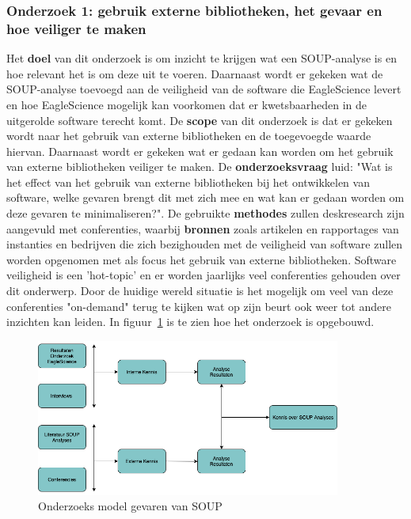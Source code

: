\subsubsection{Onderzoek 1: gebruik externe bibliotheken, het gevaar en hoe veiliger te maken}
Het \textbf{doel} van dit onderzoek is om inzicht te krijgen wat een SOUP-analyse is en hoe relevant het is om deze uit te voeren. Daarnaast wordt er gekeken wat de SOUP-analyse toevoegd aan de veiligheid van de software die EagleScience levert en hoe EagleScience mogelijk kan voorkomen dat er kwetsbaarheden in de uitgerolde software terecht komt.
De \textbf{scope} van dit onderzoek is dat er gekeken wordt naar het gebruik van externe bibliotheken en de toegevoegde waarde hiervan. Daarnaast wordt er gekeken wat er gedaan kan worden om het gebruik van externe bibliotheken veiliger te maken.
De \textbf{onderzoeksvraag} luid: "Wat is het effect van het gebruik van externe bibliotheken bij het ontwikkelen van software, welke gevaren brengt dit met zich mee en wat kan er gedaan worden om deze gevaren te minimaliseren?".
De gebruikte \textbf{methodes} zullen deskresearch zijn aangevuld met conferenties, waarbij \textbf{bronnen} zoals artikelen en rapportages van instanties en bedrijven die zich bezighouden met de veiligheid van software zullen worden opgenomen met als focus het gebruik van externe bibliotheken. Software veiligheid is een 'hot-topic' en er worden jaarlijks veel conferenties gehouden over dit onderwerp. Door de huidige wereld situatie is het mogelijk om veel van deze conferenties "on-demand" terug te kijken wat op zijn beurt ook weer tot andere inzichten kan leiden. In figuur~\ref{fig:OnderzoeksModelNoodZaakSOUP} is te zien hoe het onderzoek is opgebouwd.
\begin{figure}[htbp]
    \myfloatalign
    \includegraphics[width=10cm]{gfx/OnderzoeksmodelSOUP}
    \caption{Onderzoeks model gevaren van SOUP}
    \label{fig:OnderzoeksModelNoodZaakSOUP}
\end{figure}



